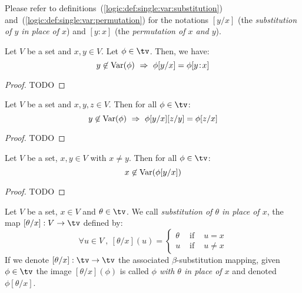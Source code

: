 Please refer to definitions~(\ref{logic:def:single:var:substitution})
and~(\ref{logic:def:single:var:permutation}) for the notations $[y/x]$ 
(the {\em substitution of $y$ in place of $x$}) and 
$[y\!:\!x]$ (the  {\em permutation of $x$ and $y$}).

\begin{prop}\label{logic:prop:LAM:permutation:is:substitution}
    Let $V$ be a set and $x,y\in V$. Let $\phi\in\tv$. Then, we have:
        \[
            y\not\in\var(\phi)\ \Rightarrow\ \phi[y/x]=\phi[y\!:\!x]
        \]
\end{prop}
\begin{proof}
TODO
\end{proof}

\begin{prop}\label{logic:prop:LAM:single:composition}
    Let $V$ be a set and $x,y,z\in V$. Then for all $\phi\in\tv$:
        \[
            y\not\in\var(\phi)\ \Rightarrow\ \phi[y/x][z/y]=\phi[z/x]
        \]
\end{prop}
\begin{proof}
TODO
\end{proof}

\begin{prop}\label{logic:prop:LAM:inplaceof:notvar}
    Let $V$ be a set, $x,y\in V$ with $x\neq y$. Then for all $\phi\in\tv$:
        \[
            x\not\in\mbox{\rm Var}(\phi[y/x])
        \]
\end{prop}
\begin{proof}
TODO
\end{proof}

\begin{defin}\label{logic:def:LAM:single:var:beta:subst}
    Let $V$ be a set, $x\in V$ and $\theta\in\tv$. We call {\em substitution 
    of $\theta$ in place of $x$}, the map $[\theta/x]:V\to\tv$ defined by:
        \[
            \forall u\in V\ ,\ [\theta/x](u)=
                \left\{
                    \begin{array}{lcl}
                        \theta&\mbox{\ if\ }&u=x\\
                        u&\mbox{\ if\ }&u\neq x
                    \end{array}
                \right.
        \]
    If we denote $[\theta/x]:\tv\to\tv$ the associated $\beta$-substitution 
    mapping, given $\phi\in\tv$ the image $[\theta/x](\phi)$ is called
    {\em $\phi$ with $\theta$ in place of $x$} and denoted $\phi[\theta/x]$.
\end{defin}
